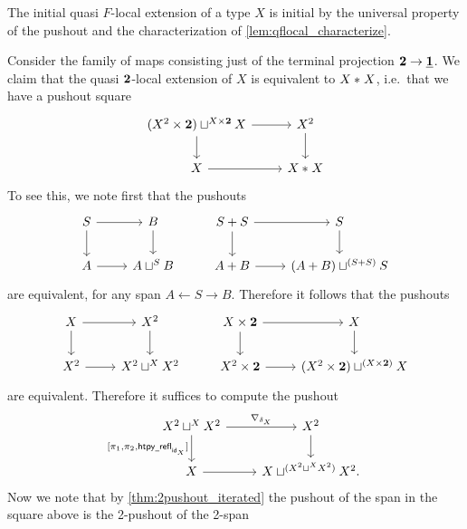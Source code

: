 \begin{rmk}
The initial quasi $F$-local extension of a type $X$ is initial by the universal property of the pushout and the characterization of \cref{lem:qflocal_characterize}.
\end{rmk}

\begin{eg}
Consider the family of maps consisting just of the terminal projection $\mathbf{2}\to\underline{\mathbf{1}}$. We claim that the quasi $\mathbf{2}$-local extension of $X$ is equivalent to ${X}\ast_{}{X}$, i.e.~that we have a pushout square
\begin{equation*}
\begin{tikzcd}
(X^2\times \bool)\sqcup^{X\times \bool} X \arrow[r] \arrow[d] & X^2 \arrow[d] \\
X \arrow[r] & \join{X}{X}
\end{tikzcd}
\end{equation*}
To see this, we note first that the pushouts
\begin{equation*}
\begin{tikzcd}
S \arrow[d] \arrow[r] & B \arrow[d] & S+S \arrow[d] \arrow[r] & S \arrow[d] \\
A \arrow[r] & A \sqcup^S B & A+B \arrow[r] & (A+B)\sqcup^{(S+S)} S
\end{tikzcd}
\end{equation*}
are equivalent, for any span $A \leftarrow S \rightarrow B$. Therefore it follows that the pushouts
\begin{equation*}
\begin{tikzcd}
X \arrow[d] \arrow[r] & X^2 \arrow[d] & X\times \bool \arrow[d] \arrow[r] & X \arrow[d] \\
X^2 \arrow[r] & X^2 \sqcup^X X^2 & X^2\times \bool \arrow[r] & (X^2\times\bool)\sqcup^{(X\times\bool)} X
\end{tikzcd}
\end{equation*}
are equivalent. Therefore it suffices to compute the pushout
\begin{equation*}
\begin{tikzcd}
X^2 \sqcup^X X^2 \arrow[r,"\nabla_{\delta_X}"] \arrow[d,swap,"{[\pi_1,\pi_2,\mathsf{htpy\usc{}refl}_{\idfunc[X]}]}"] & X^2 \arrow[d] \\
X \arrow[r] & X\sqcup^{(X^2 \sqcup^X X^2)}X^2.
\end{tikzcd}
\end{equation*}
Now we note that by \cref{thm:2pushout_iterated} the pushout of the span in the square above is the 2-pushout of the 2-span
\begin{equation*}

\end{equation*}
\end{eg}

